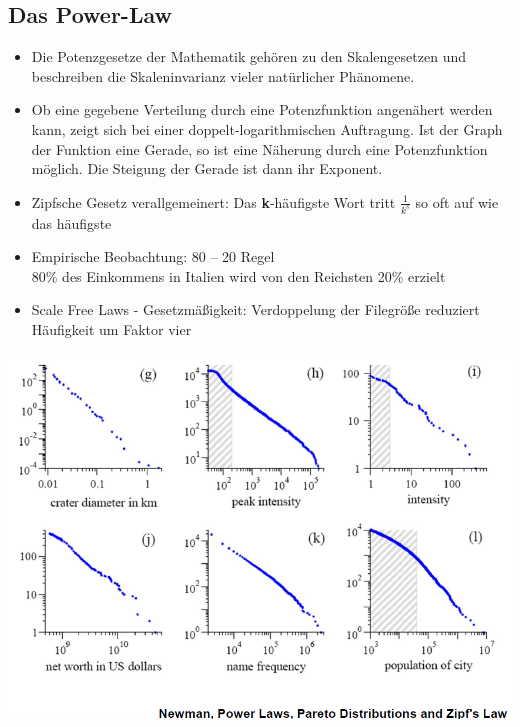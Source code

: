 \documentclass{article} %
\begin{document}
		\subsection{Das Power-Law}
	\begin{itemize}
		\item Die Potenzgesetze der Mathematik gehören zu den Skalengesetzen und beschreiben die Skaleninvarianz vieler natürlicher Phänomene.
		\item Ob eine gegebene Verteilung durch eine Potenzfunktion angenähert werden kann, zeigt sich bei einer doppelt-logarithmischen Auftragung. Ist der Graph der Funktion eine Gerade, so ist eine Näherung durch eine Potenzfunktion möglich. Die Steigung der Gerade ist dann ihr Exponent.
		\item Zipfsche Gesetz verallgemeinert: Das \textbf{k}-häufigste Wort tritt $\frac{1}{k^{s}}$ so oft auf wie das häufigste
		\item Empirische Beobachtung: 80 – 20 Regel\\
		80\% des Einkommens in Italien wird von den Reichsten 20\% erzielt
		\item Scale Free Laws - Gesetzmäßigkeit: Verdoppelung der Filegröße reduziert Häufigkeit um Faktor vier 
		
	\end{itemize}
	\begin{center}
		\includegraphics[scale=0.5]{img/power.png}
	\end{center}
	
\end{document}
